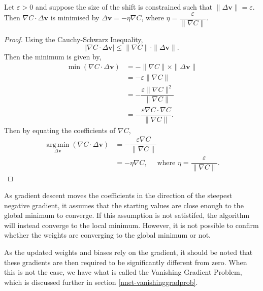 \begin{proposition}\label{nnets-graddescminproof}
	Let $\varepsilon > 0$ and suppose the size of the shift is constrained such that $\|\Delta\mathbf{v}\| = \varepsilon$. Then $\nabla C \cdot \Delta\mathbf{v}$ is minimised by $\Delta\mathbf{v} = -\eta\nabla C$, where $\eta = \dfrac{\varepsilon}{\|\nabla C\|}$.
\end{proposition}

\begin{proof}
	Using the Cauchy-Schwarz Inequality,
	\[
			|\nabla C\cdot\Delta\mathbf{v}| \le \|\nabla C\|\cdot\|\Delta\mathbf{v}\|.
	\]
	Then the minimum is given by, \begin{align*}
		\min(\nabla C\cdot\Delta\mathbf{v}) & = -\|\nabla C\|\times\|\Delta\mathbf{v}\| \\
		& = -\varepsilon\|\nabla C\| \\
		& = -\dfrac{\varepsilon\|\nabla C\|^2}{\|\nabla C\|} \\
		& = -\dfrac{\varepsilon\nabla C\cdot\nabla C}{\|\nabla C\|}.
	\end{align*}
	Then by equating the coefficients of $\nabla C$,
	\begin{align*}
		\operatorname*{arg\,min}_{\Delta\mathbf{v}}(\nabla C\cdot\Delta\mathbf{v}) & = -\dfrac{\varepsilon\nabla C}{\|\nabla C\|} \\
		& = -\eta\nabla C,\quad\text{ where }\eta = \dfrac{\varepsilon}{\|\nabla C\|}.
	\end{align*}
\end{proof}

As gradient descent moves the coefficients in the direction of the steepest negative gradient, it assumes that the starting values are close enough to the global minimum to converge. If this assumption is not satistifed, the algorithm will instead converge to the local minimum. However, it is not possible to confirm whether the weights are converging to the global minimum or not.

%

As the updated weights and biases rely on the gradient, it should be noted that these gradients are then required to be significantly different from zero. When this is not the case, we have what is called the Vanishing Gradient Problem, which is discussed further in section \ref{nnet-vanishinggradprob}.

